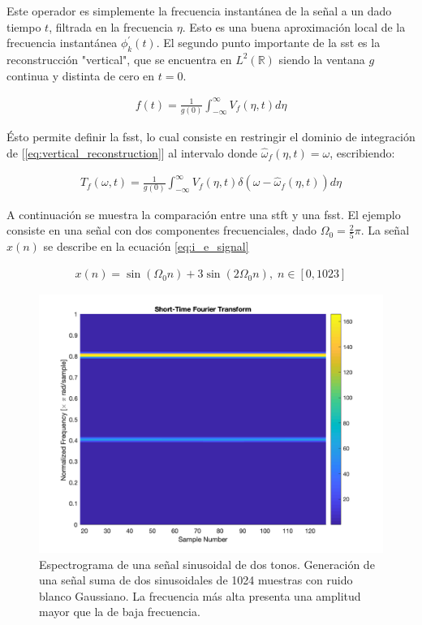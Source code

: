 \indent Este operador es simplemente la frecuencia instantánea de la señal a un dado tiempo $t$, filtrada en la
frecuencia $\eta$. Esto es una buena aproximación local de la frecuencia instantánea $\phi_k^{'}(t)$. El segundo
punto importante de la \acrshort{sst} es la reconstrucción "vertical", que se encuentra en $L^2(\mathbb{R})$ siendo
la ventana $g$ continua y distinta de cero en $t=0$.

\begin{align} \label{eq:vertical_reconstruction}
  f(t) = \frac{1}{g(0)} \int_{-\infty}^\infty V_f(\eta,t)d\eta
\end{align}

\indent Ésto permite definir la \acrshort{fsst}, lo cual consiste en restringir el dominio de integración de
[\ref{eq:vertical_reconstruction}] al intervalo donde $\hat{\omega}_f(\eta,t) = \omega$, escribiendo:

\begin{align}
  T_f(\omega,t) = \frac{1}{g(0)} \int_{-\infty}^\infty V_f(\eta,t)\delta(\omega-\hat{\omega}_f(\eta,t))d\eta
\end{align}

\indent A continuación se muestra la comparación entre una \acrshort{stft} y una \acrshort{fsst}. El ejemplo
consiste en una señal con dos componentes frecuenciales, dado $\Omega_0=\frac{2}{5}\pi$. La señal $x(n)$ se describe
en la ecuación \ref{eq:i_e_signal}

\begin{align} \label{eq:i_e_signal}
  x(n) = \sin(\Omega_0 n) + 3\sin(2\Omega_0 n), \; n \in [0,1023]
\end{align}

\begin{figure}[H]
\centering
\includegraphics[scale=0.35]{chapters/chapter-05/images/stft.png}
\caption[Espectrograma de una señal sinusoidal de dos tonos]{Espectrograma de una señal sinusoidal de dos tonos.
Generación de una señal suma de dos sinusoidales de 1024 muestras con ruido blanco Gaussiano. La frecuencia más alta
presenta una amplitud mayor que la de baja frecuencia.}
\label{fig:i_e_stft}
\end{figure}

